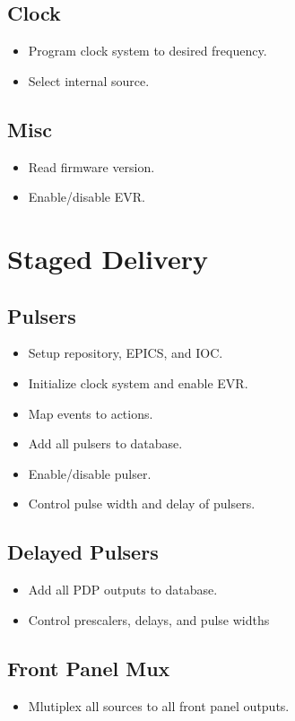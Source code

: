 \documentclass[a4paper,10pt]{article}
\begin{document}
	\subsection{Clock}
	\begin{itemize}
		\item Program clock system to desired frequency.
		\item Select internal source.
	\end{itemize}

	\subsection{Misc}
	\begin{itemize}
		\item Read firmware version.
		\item Enable/disable EVR.
	\end{itemize}

\section{Staged Delivery}
	\subsection{Pulsers}
	\begin{itemize}
		\item Setup repository, EPICS, and IOC.
		\item Initialize clock system and enable EVR.
		\item Map events to actions.
		\item Add all pulsers to database.
		\item Enable/disable pulser.
		\item Control pulse width and delay of pulsers.
	\end{itemize}

	\subsection{Delayed Pulsers}
	\begin{itemize}
		\item Add all PDP outputs to database.
		\item Control prescalers, delays, and pulse widths
	\end{itemize}

	\subsection{Front Panel Mux}
	\begin{itemize}
		\item Mlutiplex all sources to all front panel outputs.
	\end{itemize}
\end{document}
